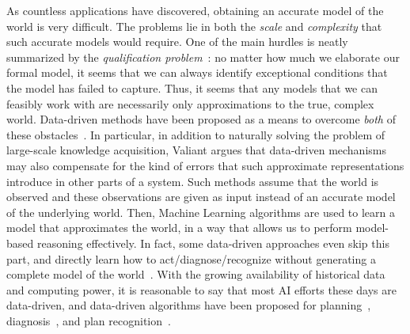 \documentclass[12pt]{article}
\newcommand{\note}[1]{\textbf{\textit{#1}}}
\begin{document}
As countless applications have discovered, obtaining an accurate model of the world is very difficult. The problems lie in both the {\em scale} and {\em complexity} that such accurate models would require. One of the main hurdles is neatly summarized by the {\em qualification problem}~\cite{mccarthy1987epistemological}: no matter how much we elaborate our formal model, it seems that we can always identify exceptional conditions that the model has failed to capture. Thus, it seems that any models that we can feasibly work with are necessarily only approximations to the true, complex world. Data-driven methods have been proposed as a means to overcome {\em both} of these obstacles~\cite{valiant2000neuroidal,valiant2000robustLogics}. In particular, in addition to naturally solving the problem of large-scale knowledge acquisition, Valiant argues that data-driven mechanisms may also compensate for the kind of errors that such approximate representations introduce in other parts of a system. Such methods assume that the world is observed and these observations are given as input instead of an accurate model of the underlying world. Then, Machine Learning algorithms are used to learn a model that approximates the world, 
in a way that allows us to perform model-based reasoning effectively. 
In fact, some data-driven approaches even skip this part, and directly learn how to act/diagnose/recognize without generating a complete model of the world~\cite{kearns2002POMDPsample}.
With the growing availability of historical data and computing power, it is reasonable to say that most AI efforts these days are data-driven,
and data-driven algorithms have been proposed for planning~\cite{fern2011first}, diagnosis~\cite{keren2011model,qin2012survey}, and plan recognition~\cite{peng2011helix,tian2016discovering,harpstead2013investigating}. 

\end{document}
